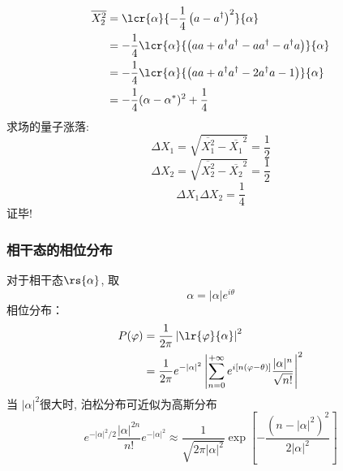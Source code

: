 \begin{frame}
      \frametitle{}
      \[
        \begin{aligned}
          \overline{X^2 _2} &= \lcr{\alpha}{-\frac{1}{4}\left(a-a^{\dagger}\right)^2} {\alpha}  \\ 
          &= -\frac{1}{4}\lcr{\alpha}{\left(aa+a^{\dagger}a^{\dagger}- aa^{\dagger} - a^{\dagger}a\right)} {\alpha}  \\
          &= -\frac{1}{4}\lcr{\alpha}{\left(aa+a^{\dagger}a^{\dagger}- 2a^{\dagger}a - 1 \right)} {\alpha} \\
          &= -\frac{1}{4}(\alpha - \alpha^*)^2 + \frac{1}{4}
        \end{aligned}   
        \]  
        求场的量子涨落:
        \[ \Delta X_1 = \sqrt{\overline{X^2 _1}- \overline{X_1}^2} = \frac{1}{2}\]
        \[ \Delta X_2 = \sqrt{\overline{X^2 _2}- \overline{X_2}^2} = \frac{1}{2}\]
        \[ \Delta X_1 \Delta X_2=\frac{1}{4}\]
    证毕!
\end{frame}

\begin{frame} 
\frametitle{相干态的相位分布}
对于相干态$\rs{\alpha}$, 取
\[ \alpha = \left|\alpha\right| e^{i\theta}\]
相位分布：
    \[\begin{aligned}
    P(\varphi) &=\frac{1}{2\pi} \left| \lr{\varphi}{\alpha} \right|^2 \\ 
    &= \frac{1}{2\pi} e^{-\left|\alpha\right|^2} \left|  \sum_{n=0} ^{+\infty}  e^{i[n(\varphi-\theta)]}\frac{|\alpha|^n}{\sqrt{n!}} \right|^2
    \end{aligned} \] 
当 $|\alpha|^2$很大时, 泊松分布可近似为高斯分布
\[ e^{-\left|\alpha\right|^2 /2}\frac{|\alpha|^{2n}}{n!} e^{-\left|\alpha\right|^2} \approx \frac{1}{\sqrt{2\pi \left|\alpha\right|^2}} \exp[-\frac{(n-\left|\alpha\right|^2)^2}{2\left|\alpha\right|^2}]\]   
\end{frame}

